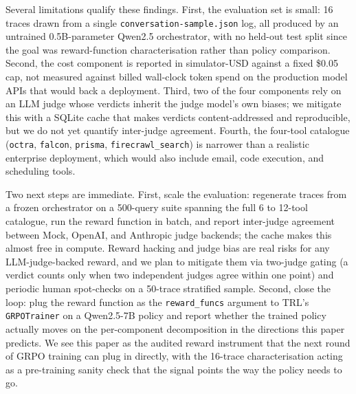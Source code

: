 \documentclass[10pt,twocolumn]{article}
\begin{document}
Several limitations qualify these findings. First, the evaluation set is small: 16 traces drawn from a single \texttt{conversation-sample.json} log, all produced by an untrained 0.5B-parameter Qwen2.5 orchestrator, with no held-out test split since the goal was reward-function characterisation rather than policy comparison. Second, the cost component is reported in simulator-USD against a fixed \$0.05 cap, not measured against billed wall-clock token spend on the production model APIs that would back a deployment. Third, two of the four components rely on an LLM judge whose verdicts inherit the judge model's own biases; we mitigate this with a SQLite cache that makes verdicts content-addressed and reproducible, but we do not yet quantify inter-judge agreement. Fourth, the four-tool catalogue (\texttt{octra}, \texttt{falcon}, \texttt{prisma}, \texttt{firecrawl\_search}) is narrower than a realistic enterprise deployment, which would also include email, code execution, and scheduling tools.

Two next steps are immediate. First, scale the evaluation: regenerate traces from a frozen orchestrator on a 500-query suite spanning the full 6 to 12-tool catalogue, run the reward function in batch, and report inter-judge agreement between Mock, OpenAI, and Anthropic judge backends; the cache makes this almost free in compute. Reward hacking and judge bias are real risks for any LLM-judge-backed reward, and we plan to mitigate them via two-judge gating (a verdict counts only when two independent judges agree within one point) and periodic human spot-checks on a 50-trace stratified sample. Second, close the loop: plug the reward function as the \texttt{reward\_funcs} argument to TRL's \texttt{GRPOTrainer} on a Qwen2.5-7B policy and report whether the trained policy actually moves on the per-component decomposition in the directions this paper predicts. We see this paper as the audited reward instrument that the next round of GRPO training can plug in directly, with the 16-trace characterisation acting as a pre-training sanity check that the signal points the way the policy needs to go.


\FloatBarrier



\end{document}

